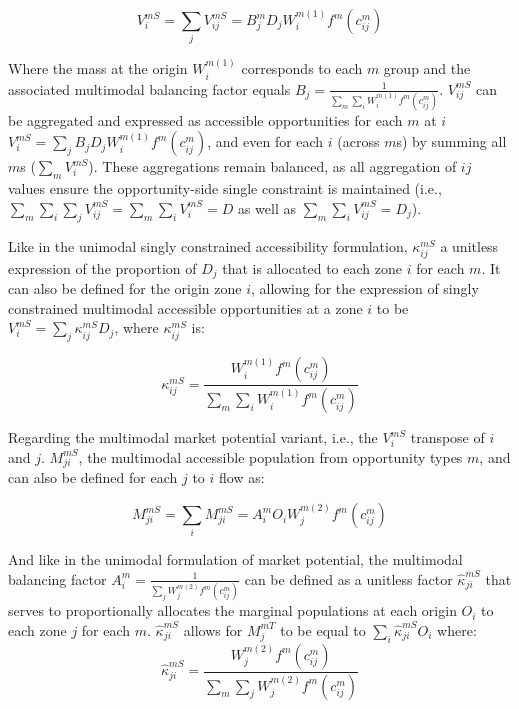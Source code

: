 \documentclass[
11pt, %
oneside, %
english, %
singlespacing, %
]{macthesis} %
\begin{document}
\begin{equation}
\label{eq:singly-constrained-multimodal-accessibility}
V^{mS}_{i} = \sum_j V^{mS}_{ij} = B_j^{m} D_j W_i^{m(1)} f^m(c^m_{ij})
\end{equation} 

Where the mass at the origin \(W_i^{m(1)}\) corresponds to each \(m\) group and the associated multimodal balancing factor equals \(B_j = \frac{1}{\sum_m\sum_i W_i^{m(1)} f^m(c^m_{ij})}\). \(V^{mS}_{ij}\) can be aggregated and expressed as accessible opportunities for each \(m\) at \(i\) \(V^{mS}_{i} = \sum_j B_j D_j W_i^{m(1)} f^m(c^m_{ij})\), and even for each \(i\) (across \(m\)s) by summing all \(m\)s (\(\sum_m V^{mS}_{i}\)). These aggregations remain balanced, as all aggregation of \(ij\) values ensure the opportunity-side single constraint is maintained (i.e., \(\sum_m\sum_i\sum_j V^{mS}_{ij} = \sum_m\sum_i V^{mS}_{i} = D\) as well as \(\sum_m \sum_i V^{mS}_{ij} =  D_j\)).

Like in the unimodal singly constrained accessibility formulation, \(\kappa_{ij}^{mS}\) a unitless expression of the proportion of \(D_j\) that is allocated to each zone \(i\) for each \(m\). It can also be defined for the origin zone \(i\), allowing for the expression of singly constrained multimodal accessible opportunities at a zone \(i\) to be \(V^{mS}_i = \sum_j \kappa_{ij}^{mS} D_j\), where \(\kappa_{ij}^{mS}\) is:

\begin{equation}
\label{eq:multimodal-opportunity-constrained-proportional-allocation-factor}
\kappa^{mS}_{ij} = \frac{W_i^{m(1)} f^m(c^m_{ij})}{\sum_m\sum_i W_i^{m(1)} f^m(c^m_{ij})}
\end{equation} 

Regarding the multimodal market potential variant, i.e., the \(V_i^{mS}\) transpose of \(i\) and \(j\). \(M^{mS}_{ji}\), the multimodal accessible population from opportunity types \(m\), and can also be defined for each \(j\) to \(i\) flow as:

\begin{equation}
\label{eq:singly-constrained-multimodal-market}
M^{mS}_{ji} = \sum_i M^{mS}_{ji} = A_i^{m} O_i W_j^{m(2)} f^m(c^m_{ij})
\end{equation} 

And like in the unimodal formulation of market potential, the multimodal balancing factor \(A_i^{m} = \frac{1}{\sum_j W_j^{m(2)} f^m(c^m_{ij})}\) can be defined as a unitless factor \(\hat \kappa^{mS}_{ji}\) that serves to proportionally allocates the marginal populations at each origin \(O_i\) to each zone \(j\) for each \(m\). \(\hat \kappa^{mS}_{ji}\) allows for \(M^{mT}_j\) to be equal to \(\sum_i \hat \kappa_{ji}^{mS} O_i\) where:
\[
\hat \kappa_{ji}^{mS} = \frac{W_j^{m(2)} f^m(c^m_{ij})}{\sum_m\sum_j W_j^{m(2)} f^m(c^m_{ij})}
\]
\end{document}
